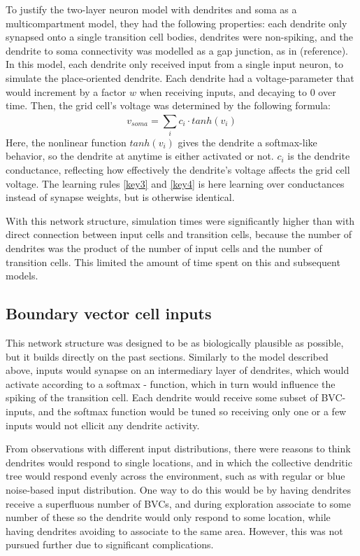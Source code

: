 \documentclass{article}
\begin{document}
    To justify the two-layer neuron model with dendrites and soma as a multicompartment model, they had the following properties: each dendrite only synapsed onto a single transition cell bodies, dendrites were non-spiking, and the dendrite to soma connectivity was modelled as a gap junction, as in (reference). In this model, each dendrite only received input from a single input neuron, to simulate the place-oriented dendrite. Each dendrite had a voltage-parameter that would increment by a factor \(w\) when receiving inputs, and decaying to 0 over time. Then, the grid cell's voltage was determined by the following formula: \[ v_{soma} = \sum_{i}^{} c_i \cdot tanh(v_i)\] Here, the nonlinear function \(tanh(v_i)\) gives the dendrite a softmax-like behavior, so the dendrite at anytime is either activated or not. \(c_i\) is the dendrite conductance, reflecting how effectively the dendrite's voltage affects the grid cell voltage. The learning rules \ref*{key3} and \ref*{key4} is here learning over conductances instead of synapse weights, but is otherwise identical.

    With this network structure, simulation times were significantly higher than with direct connection between input cells and transition cells, because the number of dendrites was the product of the number of input cells and the number of transition cells. This limited the amount of time spent on this and subsequent models.

    \subsection{Boundary vector cell inputs}
    This network structure was designed to be as biologically plausible as possible, but it builds directly on the past sections. Similarly to the model described above, inputs would synapse on an intermediary layer of dendrites, which would activate according to a softmax - function, which in turn would influence the spiking of the transition cell. Each dendrite would receive some subset of BVC-inputs, and the softmax function would be tuned so receiving only one or a few inputs would not ellicit any dendrite activity.

    From observations with different input distributions, there were reasons to think dendrites would respond to single locations, and in which the collective dendritic tree would respond evenly across the environment, such as with regular or blue noise-based input distribution. One way to do this would be by having dendrites receive a superfluous number of BVCs, and during exploration associate to some number of these so the dendrite would only respond to some location, while having dendrites avoiding to associate to the same area. However, this was not pursued further due to significant complications.
    
\end{document}
